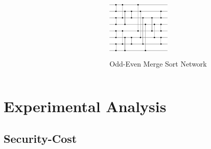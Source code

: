 \documentclass{beamer}
\begin{document}
\begin{frame}
\begin{columns}
\begin{column}[c]{3cm}
\begin{figure}
\end{figure}
\end{column}
\begin{column}[c]{3cm}
\begin{figure}
\vspace{-5ex}
\centering
\includegraphics[width=3cm, height=3cm]{networkOdddEven.png} 
\caption{Odd-Even Merge Sort Network } 
\end{figure}
\end{column}
\end{columns}

\end{frame}



\section[Experimental Analysis]{Experimental Analysis}

\subsection{Security-Cost}
\end{document}
